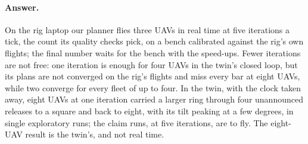 
\paragraph{Answer.} On the rig laptop our planner flies three UAVs in real time at five iterations a tick, the count
its quality checks pick, on a bench calibrated against the rig's own flights; the final number waits for the bench
with the speed-ups. Fewer iterations are not free: one iteration is enough for four UAVs in the twin's closed
loop, but its plans are not converged on the rig's flights and miss every bar at eight UAVs, while two converge
for every fleet of up to four. In the twin, with the clock taken away, eight UAVs at one iteration carried a larger
ring through four unannounced releases to a square and back to eight, with its tilt peaking at a few degrees, in single
exploratory runs; the claim runs, at five iterations, are to fly. The eight-UAV result is the twin's, and not real
time.
